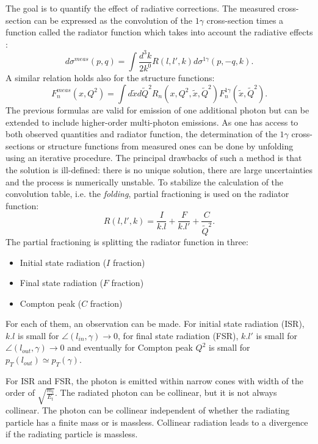 The goal is to quantify the effect of radiative corrections. The measured cross-section can be expressed as the convolution of the $1\gamma$ cross-section times a function called the radiator function which takes into account the radiative effects \cite{DjangohSeminar}:
%
\begin{equation}
  d\sigma^{meas}(p,q) = \int \frac{d^{3}k}{2k^{0}}R(l,l',k)d\sigma^{1\gamma}(p,-q,k).
\end{equation}
%
A similar relation holds also for the structure functions:
%
\begin{equation}
  F_{n}^{meas}(x,Q^{2}) = \int d\tilde{x}d\tilde{Q}^{2}R_{n}(x,Q^{2},\tilde{x},\tilde{Q}^{2})F_{n}^{1\gamma}(\tilde{x},\tilde{Q}^{2}).
\end{equation}
%
The previous formulas are valid for emission of one additional photon but can be extended to include higher-order multi-photon emissions. As one has access to both observed quantities and radiator function, the determination of the $1\gamma$ cross-sections or structure functions from measured ones can be done by unfolding using an iterative procedure. The principal drawbacks of such a method is that the solution is ill-defined: there is no unique solution, there are large uncertainties and the process is numerically unstable. To stabilize the calculation of the convolution table, i.e. the \textit{folding}, partial fractioning is used on the radiator function:
%
\begin{equation}
  R(l,l',k) = \frac{I}{k.l}+\frac{F}{k.l'}+\frac{C}{\tilde{Q}^{2}}.
\end{equation}
%
The partial fractioning is splitting the radiator function in three:
\begin{itemize}
\item Initial state radiation ($I$ fraction)
\item Final state radiation ($F$ fraction)
\item Compton peak ($C$ fraction)
\end{itemize}

For each of them, an observation can be made. For initial state radiation (ISR), $k.l$ is small for
$\angle (l_{in},\gamma) \rightarrow 0$, for final state radiation (FSR), $k.l'$ is small for
$\angle (l_{out},\gamma) \rightarrow 0$ and eventually for Compton peak $Q^{2}$ is small for
$p_{T}(l_{out}) \simeq p_{T}(\gamma)$.

For ISR and FSR, the photon is emitted within narrow cones with width of the order of $\sqrt{\frac{m_{t}}{E_{t}}}$. The radiated photon can be collinear, but it is not always collinear.
The photon can be collinear independent of whether the radiating particle has a finite mass or is massless. Collinear radiation leads to a divergence if the radiating particle is massless.


